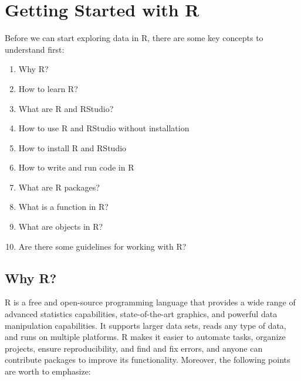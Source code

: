 \documentclass[
  12pt,
  oneside]{book}
\providecommand{\tightlist}{%
  \setlength{\itemsep}{0pt}\setlength{\parskip}{0pt}}
\theoremstyle{definition}
\theoremstyle{definition}
\theoremstyle{definition}
\theoremstyle{definition}
\theoremstyle{remark}
\begin{document}
\hypertarget{getting-started}{%
\chapter{Getting Started with R}\label{getting-started}}

Before we can start exploring data in R, there are some key concepts to understand first:

\begin{enumerate}
\def\labelenumi{\arabic{enumi}.}
\tightlist
\item
  Why R?
\item
  How to learn R?
\item
  What are R and RStudio?
\item
  How to use R and RStudio without installation
\item
  How to install R and RStudio
\item
  How to write and run code in R
\item
  What are R packages?
\item
  What is a function in R?
\item
  What are objects in R?
\item
  Are there some guidelines for working with R?
\end{enumerate}

\hypertarget{sec:whyR}{%
\section{Why R?}\label{sec:whyR}}

R is a free and open-source programming language that provides a wide range of advanced statistics capabilities, state-of-the-art graphics, and powerful data manipulation capabilities. It supports larger data sets, reads any type of data, and runs on multiple platforms. R makes it easier to automate tasks, organize projects, ensure reproducibility, and find and fix errors, and anyone can contribute packages to improve its functionality. Moreover, the following points are worth to emphasize:
\end{document}
